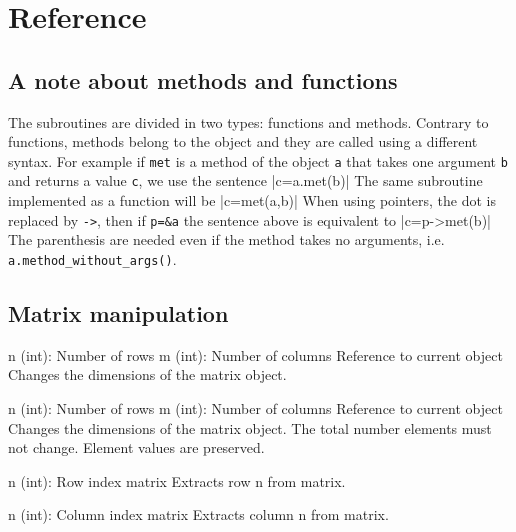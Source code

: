 \section{Reference}

\renewcommand{\funclistcolumns}{2}

\subsection{A note about methods and functions}

The subroutines are divided in two types: functions and methods. Contrary to functions, methods belong
to the object and they are called using a different syntax. For example if {\tt met} is a method
of the object {\tt a} that takes one argument {\tt b} and returns a value {\tt c}, we use the sentence
|c=a.met(b)|
The same subroutine implemented as a function will be
|c=met(a,b)|
When using pointers, the dot is replaced by \verb|->|, then if \verb|p=&a| the sentence above
is equivalent to
|c=p->met(b)|
The parenthesis are needed even if the method takes no arguments, i.e. 
\verb|a.method_without_args()|.


\subsection{Matrix manipulation}

{n (int): Number of rows\newline
m (int): Number of columns}
{Reference to current object}
{Changes the dimensions of the matrix object.}

{n (int): Number of rows\newline
m (int): Number of columns}
{Reference to current object}
{Changes the dimensions of the matrix object. The total number elements must not change. Element
values are preserved.}



{n (int): Row index}
{matrix}
{Extracts row n from matrix.}

{n (int): Column index}
{matrix}
{Extracts column n from matrix.}

